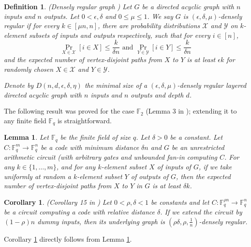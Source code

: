 \documentclass[11pt]{article}
\newtheorem{lemma}{Lemma}
\newtheorem{corollary}{Corollary}
\newtheorem{definition}{Definition}
\begin{document}
\begin{definition} \label{def:densely_regular} (Densely regular graph \cite{Pud94}) Let $G$ be a directed acyclic graph with $n$ inputs and $n$ outputs. Let $0 < \epsilon, \delta$ and $0 \le \mu \le 1$. We
say $G$ is \emph{$(\epsilon, \delta, \mu)$-densely regular} if for every $k \in [\mu n, n]$, there are probability distributions $\mathcal{X}$
and $\mathcal{Y}$ on $k$-element subsets of inputs and outputs respectively, such that for every $i \in [n]$,
\[
\Pr_{X \in \mathcal{X}}[i \in X] \le \frac{k}{\delta n}
\text{ and }
\Pr_{Y \in \mathcal{Y}}[i \in Y] \le \frac{k}{\delta n}
\]
and the expected number of vertex-disjoint paths from $X$ to $Y$ is at least $\epsilon k$ for randomly chosen $X \in \mathcal{X}$ and $Y \in \mathcal{Y}$.

Denote by $D(n, d, \epsilon, \delta, \eta)$ the minimal size of a $(\epsilon, \delta, \mu)$-densely regular layered directed acyclic graph with $n$ inputs and $n$ outputs and depth $d$. 
\end{definition}

The following result was proved for the case $\mathbb{F}_2$ (Lemma 3 in \cite{gal2013tight}); extending it to any finite field $\mathbb{F}_q$ is straightforward.

\begin{lemma}
\label{lem:vertex_disjoint_in_codes}
Let $\mathbb{F}_q$ be the finite field of size $q$. Let $\delta > 0$ be a constant. Let $C : \mathbb{F}_q^m \to \mathbb{F}_q^n$ be a code with minimum distance $\delta n$ and $G$ be an unrestricted arithmetic circuit (with arbitrary gates and unbounded fan-in computing $C$. For any $k \in \{1, \ldots, m\}$, and for any $k$-element subset $X$ of inputs of $G$, if we take uniformly at random a $k$-element subset $Y$ of outputs of $G$, then the expected number of vertex-disjoint paths from $X$ to $Y$ in $G$ is at least $\delta k$.
\end{lemma}


\begin{corollary}
\label{cor:codes_to_dr_graph}
(Corollary 15 in \cite{gal2013tight})
Let $0 < \rho, \delta < 1$ be constants and let $C:\mathbb{F}_q^{\rho n} \to \mathbb{F}_q^n$ be a circuit computing a code with relative distance $\delta$. If we extend the circuit by $(1-\rho)n$ dummy inputs, then its underlying graph is $(\rho\delta, \rho, \tfrac{1}{n})$-densely regular.
\end{corollary}

Corollary \ref{cor:codes_to_dr_graph} directly follows from Lemma \ref{lem:vertex_disjoint_in_codes}.
\end{document}
